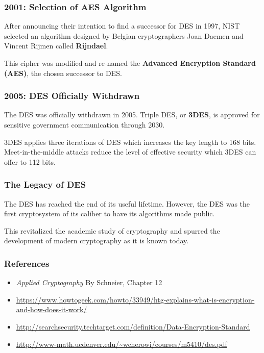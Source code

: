 \documentclass{beamer}
\newcommand{\<}{\langle}
\renewcommand{\>}{\rangle}
\begin{document}
\begin{frame}
\frametitle{2001: Selection of AES Algorithm}

After announcing their intention to find a successor for DES in 1997, NIST selected an algorithm designed by Belgian cryptographers Joan Daemen and Vincent Rijmen called \textbf{Rijndael}. \newline

This cipher was modified and re-named the \textbf{Advanced Encryption Standard (AES)}, the chosen successor to DES.
\end{frame}



\begin{frame}
\frametitle{2005: DES Officially Withdrawn}

The DES was officially withdrawn in 2005. Triple DES, or \textbf{3DES}, is approved for sensitive government communication through 2030.\newline

3DES applies three iterations of DES which increases the key length to 168 bits. Meet-in-the-middle attacks reduce the level of effective security which 3DES can offer to 112 bits. 
\end{frame}



\begin{frame}
\frametitle{The Legacy of DES}

The DES has reached the end of its useful lifetime. However, the DES was the first cryptosystem of its caliber to have its algorithms made public. \newline

This revitalized the academic study of cryptography and spurred the development of modern cryptography as it is known today. 
\end{frame}


\begin{frame}
\frametitle{References}

\begin{itemize}
\item \emph{Applied Cryptography} By Schneier, Chapter 12
\item {\scriptsize\url{https://www.howtogeek.com/howto/33949/htg-explains-what-is-encryption-and-how-does-it-work/}}
\item {\scriptsize\url{http://searchsecurity.techtarget.com/definition/Data-Encryption-Standard}}
\item {\scriptsize\url{http://www-math.ucdenver.edu/~wcherowi/courses/m5410/des.pdf}}
\end{itemize}
\end{frame}
\end{document}
